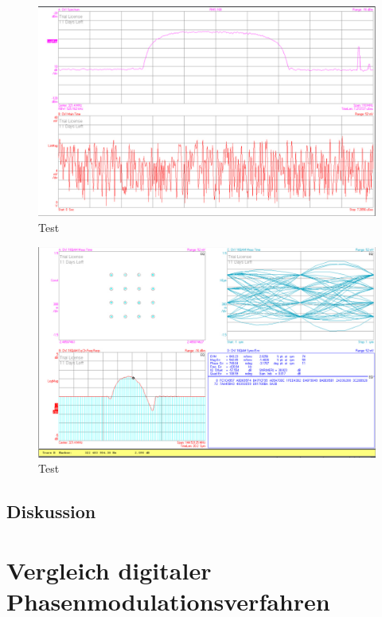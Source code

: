 \documentclass[12pt,a4paper,ngerman]{article}
\begin{document}
\begin{figure}[H]
\centering
\includegraphics[width=\textwidth]{figures/Aufgabe2_16QAM_avg.jpg} 
\caption{Test}
\end{figure}

\begin{figure}[H]
\centering
\includegraphics[width=\textwidth]{figures/Aufgabe2_16QAM_demod_equal.jpg} 
\caption{Test}
\end{figure}


\subsection{Diskussion}



\pagebreak



\section{Vergleich digitaler Phasenmodulationsverfahren}
\end{document}
